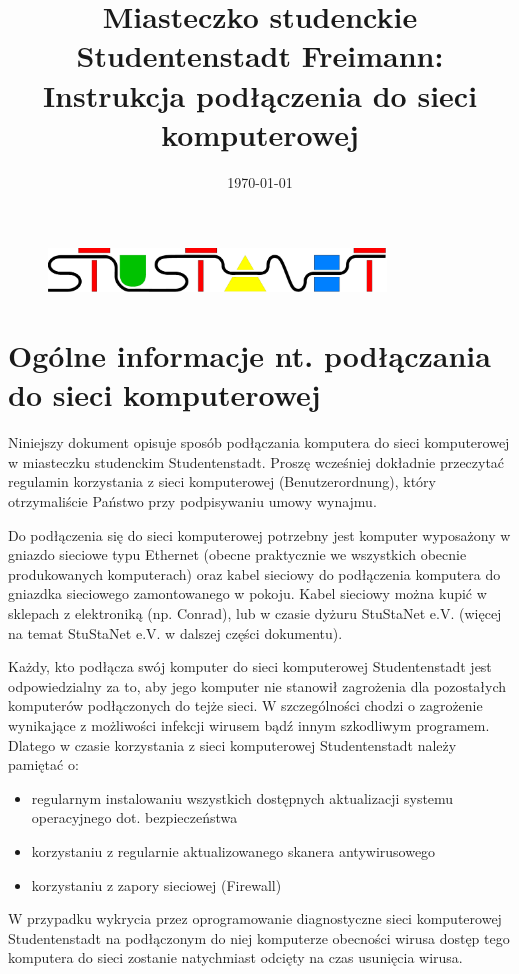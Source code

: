 \documentclass[a4paper,12pt]{scrartcl}
\title{Miasteczko studenckie Studentenstadt Freimann:\\
       Instrukcja podłączenia do sieci komputerowej}
\date{\today}
\begin{document}
\maketitle

\begin{figure}[t!]
   \centering
   \vspace{-20pt}
   \includegraphics[width=0.8\textwidth,keepaspectratio]{Bilder/stunetp}
   \vspace{-20pt}
\end{figure}

\section*{Ogólne informacje nt. podłączania do sieci komputerowej}

Niniejszy dokument opisuje sposób podłączania komputera do sieci komputerowej w miasteczku studenckim Studentenstadt. Proszę wcześniej dokładnie przeczytać regulamin korzystania z sieci komputerowej (Benutzerordnung), który otrzymaliście Państwo przy podpisywaniu umowy wynajmu.

Do podłączenia się do sieci komputerowej potrzebny jest komputer wyposażony w gniazdo sieciowe typu Ethernet (obecne praktycznie we wszystkich obecnie produkowanych komputerach) oraz kabel sieciowy do podłączenia komputera do gniazdka sieciowego zamontowanego w pokoju. Kabel sieciowy można kupić w sklepach z elektroniką (np. Conrad), lub w czasie dyżuru StuStaNet e.V. (więcej na temat StuStaNet e.V. w dalszej części dokumentu).

Każdy, kto podłącza swój komputer do sieci komputerowej Studentenstadt jest odpowiedzialny za to, aby jego komputer nie stanowił zagrożenia dla pozostałych komputerów podłączonych do tejże sieci. W szczególności chodzi o zagrożenie wynikające z możliwości infekcji wirusem bądź innym szkodliwym programem. Dlatego w czasie korzystania z sieci komputerowej Studentenstadt należy pamiętać o:
\begin{itemize}
    \item regularnym instalowaniu wszystkich dostępnych aktualizacji systemu operacyjnego dot. bezpieczeństwa
    \item korzystaniu z regularnie aktualizowanego skanera antywirusowego
    \item korzystaniu z zapory sieciowej (Firewall)
\end{itemize}
W przypadku wykrycia przez oprogramowanie diagnostyczne sieci komputerowej Studentenstadt na podłączonym do niej komputerze obecności wirusa dostęp tego komputera do sieci zostanie natychmiast odcięty na czas usunięcia wirusa.
\end{document}
